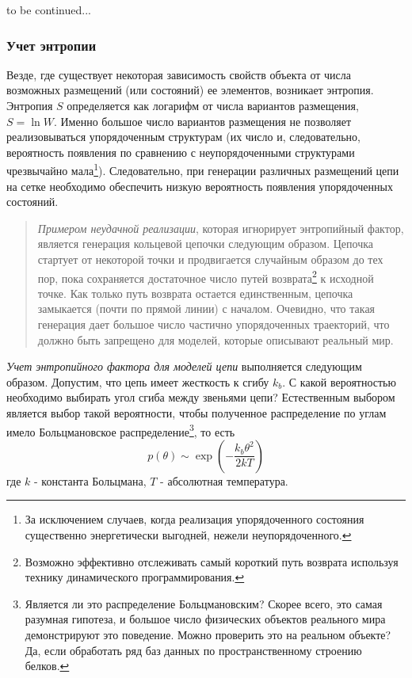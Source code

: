\documentclass[tikz,a4paper]{scrartcl} %
\begin{document}
\begin{center} 
to be continued...
\end{center}

\subsubsection*{Учет энтропии}
Везде, где существует некоторая зависимость свойств объекта от числа возможных размещений (или состояний) ее элементов, возникает энтропия. Энтропия $S$ определяется как логарифм от числа вариантов размещения, $S = \ln W$. Именно большое число вариантов размещения не позволяет реализовываться упорядоченным структурам (их число и, следовательно, вероятность появления по сравнению с неупорядоченными структурами чрезвычайно мала\footnote{За исключением случаев, когда реализация упорядоченного состояния существенно энергетически выгодней, нежели неупорядоченного.}). Следовательно, при генерации различных размещений цепи на сетке необходимо обеспечить низкую вероятность появления упорядоченных состояний.

\begin{quote} \textit{Примером неудачной реализации}, которая игнорирует энтропийный фактор, является генерация кольцевой цепочки следующим образом. Цепочка стартует от некоторой точки и продвигается случайным образом до тех пор, пока сохраняется достаточное число путей возврата\footnote{Возможно эффективно отслеживать самый короткий путь возврата используя технику динамического программирования.} к исходной точке. Как только путь возврата остается единственным, цепочка замыкается (почти по прямой линии) с началом. Очевидно, что такая генерация дает большое число частично упорядоченных траекторий, что должно быть запрещено для моделей, которые описывают реальный мир.
\end{quote}

\textit{Учет энтропийного фактора для моделей цепи} выполняется следующим образом. Допустим, что цепь имеет жесткость к сгибу $k_b$. С какой вероятностью необходимо выбирать угол сгиба между звеньями цепи? Естественным выбором является выбор такой вероятности, чтобы полученное распределение по углам имело Больцмановское распределение\footnote{Является ли это распределение Больцмановским? Скорее всего, это самая разумная гипотеза, и большое число физических объектов реального мира демонстрируют это поведение. Можно проверить это на реальном объекте? Да, если обработать ряд баз данных по пространственному строению белков.}, то есть 
\[ p(\theta) \sim \exp \left(-\frac{k_b \theta^2}{2kT} \right)  \]
где $k$ - константа Больцмана, $T$ - абсолютная температура.
\end{document}
